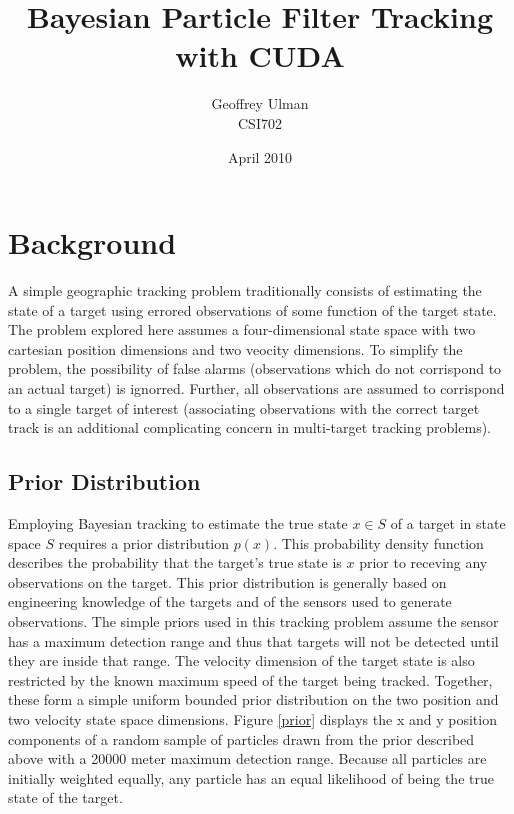 \documentclass{article}
\begin{document}
\title{Bayesian Particle Filter Tracking with CUDA}
\author{Geoffrey Ulman\\
        CSI702}
\date{April 2010}
\maketitle

\tableofcontents

\section{Background}\label{Background}
A simple geographic tracking problem traditionally consists of estimating the state of a target using errored observations of some function of the target state. The problem explored here assumes a four-dimensional state space with two cartesian position dimensions and two veocity dimensions. To simplify the problem, the possibility of false alarms (observations which do not corrispond to an actual target) is ignorred. Further, all observations are assumed to corrispond to a single target of interest (associating observations with the correct target track is an additional complicating concern in multi-target tracking problems).

\subsection{Prior Distribution}
Employing Bayesian tracking to estimate the true state \(x \in S\) of a target in state space \(S\) requires a prior distribution \(p(x)\). This probability density function describes the probability that the target's true state is \(x\) prior to receving any observations on the target. This prior distribution is generally based on engineering knowledge of the targets and of the sensors used to generate observations. The simple priors used in this tracking problem assume the sensor has a maximum detection range and thus that targets will not be detected until they are inside that range. The velocity dimension of the target state is also restricted by the known maximum speed of the target being tracked. Together, these form a simple uniform bounded prior distribution on the two position and two velocity state space dimensions. Figure \ref{prior} displays the x and y position components of a random sample of particles drawn from the prior described above with a 20000 meter maximum detection range. Because all particles are initially weighted equally, any particle has an equal likelihood of being the true state of the target.
\end{document}
